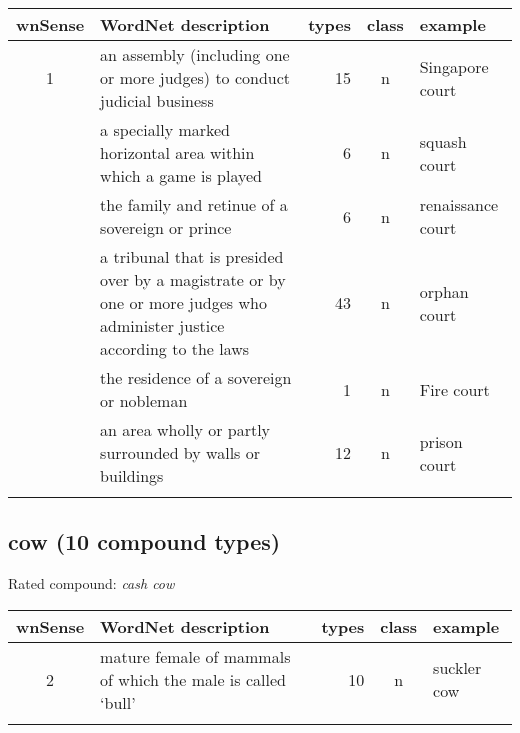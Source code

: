 \vspace*{1ex}

\noindent
\begin{longtable}{c>{\raggedright\arraybackslash}p{5cm}rc>{\raggedright\arraybackslash}p{2cm}}\lsptoprule
{\small wnSense}&WordNet description&types&class&example\\\midrule
1&an assembly (including one or more judges) to conduct judicial business&15&n&Singapore court\\\tablevspace
4&a specially marked horizontal area within which a game is played&6&n&squash court\\\tablevspace
6&the family and retinue of a sovereign or prince&6&n&renaissance court\\\tablevspace
7&a tribunal that is presided over by a magistrate or by one or more judges who administer justice according to the laws&43&n&orphan court\\\tablevspace
8&the residence of a sovereign or nobleman&1&n&Fire court\\\tablevspace
9&an area wholly or partly surrounded by walls or buildings&12&n&prison court\\\lspbottomrule
\end{longtable}

\subsection{cow      (10 compound types)}
Rated compound: \emph{cash cow}

\vspace*{1ex}

\noindent
\begin{longtable}{c>{\raggedright\arraybackslash}p{5cm}rc>{\raggedright\arraybackslash}p{2cm}}\lsptoprule
{\small wnSense}&WordNet description&types&class&example\\\midrule
2&mature female of mammals of which the male is called `bull'&10&n&suckler cow\\\lspbottomrule
\end{longtable}

